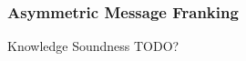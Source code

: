 \begin{frame}
	\frametitle{Asymmetric Message Franking}
	\begin{alertblock}{Knowledge Soundness}
		TODO?
	\end{alertblock}
\end{frame}


